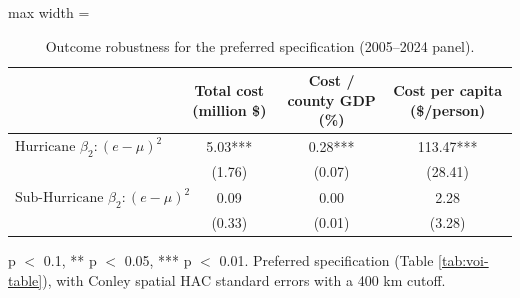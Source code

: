 \begin{table}

\caption{Outcome robustness for the preferred specification (2005--2024 panel). \label{tab:cost_outcomes}}
\centering
\begin{adjustbox}{max width = \textwidth}
\begin{threeparttable}
\begin{tabular}[t]{lccc}
\toprule
  & Total cost (million \$) & Cost / county GDP (\%) & Cost per capita (\$/person)\\
\midrule
$\text{Hurricane } \beta_2: (e - \mu)^2$ & 5.03*** & 0.28*** & 113.47***\\
 & (1.76) & (0.07) & (28.41)\\
$\text{Sub-Hurricane } \beta_2: (e - \mu)^2$ & 0.09 & 0.00 & 2.28\\
 & (0.33) & (0.01) & (3.28)\\
\bottomrule
\end{tabular}
\begin{tablenotes}
\item * p $<$ 0.1, ** p $<$ 0.05, *** p $<$ 0.01. Preferred specification (Table \ref{tab:voi-table}), with Conley spatial HAC standard errors with a 400 km cutoff.
\end{tablenotes}
\end{threeparttable}
\end{adjustbox}
\end{table}
